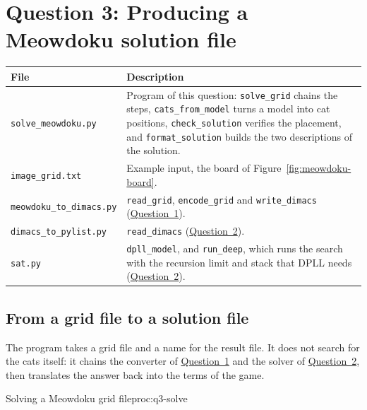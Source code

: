 \section{Question 3: Producing a Meowdoku solution file}\label{sec:q3}

\begin{center}
\begin{tabular}{@{}p{6.2cm}p{10cm}@{}}
\toprule
File & Description\\
\midrule
\texttt{solve\_meowdoku.py} & Program of this question: \texttt{solve\_grid} chains the steps, \texttt{cats\_from\_model} turns a model into cat positions, \texttt{check\_solution} verifies the placement, and \texttt{format\_solution} builds the two descriptions of the solution.\\
\texttt{image\_grid.txt} & Example input, the board of Figure~\ref{fig:meowdoku-board}.\\
\texttt{meowdoku\_to\_dimacs.py} & \texttt{read\_grid}, \texttt{encode\_grid} and \texttt{write\_dimacs} (\hyperref[sec:q1]{Question~1}).\\
\texttt{dimacs\_to\_pylist.py} & \texttt{read\_dimacs} (\hyperref[sec:q2]{Question~2}).\\
\texttt{sat.py} & \texttt{dpll\_model}, and \texttt{run\_deep}, which runs the search with the recursion limit and stack that DPLL needs (\hyperref[sec:q2]{Question~2}).\\
\bottomrule
\end{tabular}
\end{center}

\subsection{From a grid file to a solution file}

The program takes a grid file and a name for the result file. It does not search for the cats itself: it chains the converter of \hyperref[sec:q1]{Question~1} and the solver of \hyperref[sec:q2]{Question~2}, then translates the answer back into the terms of the game.

\begin{pseudo}{Solving a Meowdoku grid file}{proc:q3-solve}
\end{pseudo}

